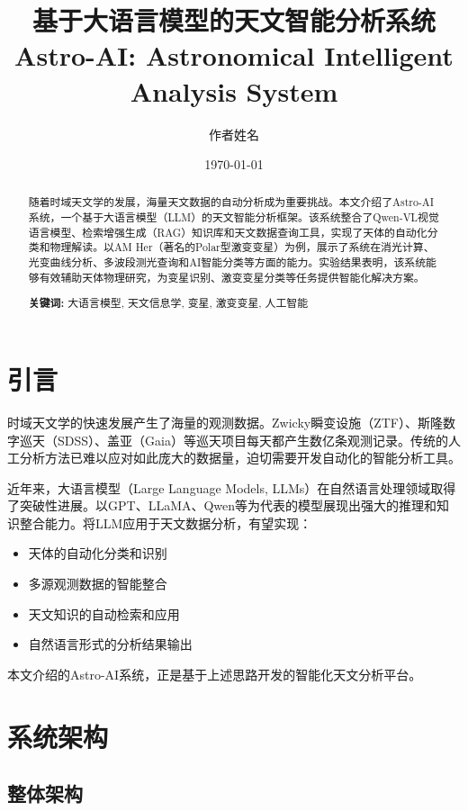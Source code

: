 \documentclass[a4paper,11pt]{article}
\title{\textbf{基于大语言模型的天文智能分析系统}\\\large Astro-AI: Astronomical Intelligent Analysis System}
\author{作者姓名}
\date{\today}
\begin{document}
\maketitle

\begin{abstract}
随着时域天文学的发展，海量天文数据的自动分析成为重要挑战。本文介绍了Astro-AI系统，一个基于大语言模型（LLM）的天文智能分析框架。该系统整合了Qwen-VL视觉语言模型、检索增强生成（RAG）知识库和天文数据查询工具，实现了天体的自动化分类和物理解读。以AM Her（著名的Polar型激变变星）为例，展示了系统在消光计算、光变曲线分析、多波段测光查询和AI智能分类等方面的能力。实验结果表明，该系统能够有效辅助天体物理研究，为变星识别、激变变星分类等任务提供智能化解决方案。

\textbf{关键词:} 大语言模型, 天文信息学, 变星, 激变变星, 人工智能
\end{abstract}

\section{引言}

时域天文学的快速发展产生了海量的观测数据。Zwicky瞬变设施（ZTF）、斯隆数字巡天（SDSS）、盖亚（Gaia）等巡天项目每天都产生数亿条观测记录。传统的人工分析方法已难以应对如此庞大的数据量，迫切需要开发自动化的智能分析工具。

近年来，大语言模型（Large Language Models, LLMs）在自然语言处理领域取得了突破性进展。以GPT、LLaMA、Qwen等为代表的模型展现出强大的推理和知识整合能力。将LLM应用于天文数据分析，有望实现：

\begin{itemize}
    \item 天体的自动化分类和识别
    \item 多源观测数据的智能整合
    \item 天文知识的自动检索和应用
    \item 自然语言形式的分析结果输出
\end{itemize}

本文介绍的Astro-AI系统，正是基于上述思路开发的智能化天文分析平台。

\section{系统架构}

\subsection{整体架构}
\end{document}
